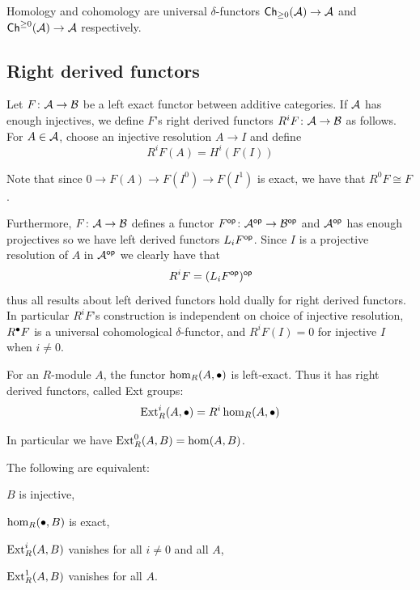 \bthrm

    Homology and cohomology are universal $\delta$-functors ${\sf Ch}_{\geq0}({{\cal A}})\to{{\cal A}}$ and ${\sf Ch}^{\geq0}({{\cal A}})\to{{\cal A}}$ respectively.

\ethrm

\subsection{Right derived functors}

\bdefn

    Let $F\colon{{\cal A}}\to{{\cal B}}$ be a left exact functor between additive categories.
    If ${{\cal A}}$ has enough injectives, we define $F$'s {\emphcolor right derived functors} $R^iF\colon{{\cal A}}\to{{\cal B}}$ as follows.
    For $A\in{{\cal A}}$, choose an injective resolution $A\to I$ and define
    $$ R^iF(A) = H^i(F(I)) $$

\edefn

Note that since $0\to F(A)\to F(I^0)\to F(I^1)$ is exact, we have that $R^0F\cong F$.

Furthermore, $F\colon{{\cal A}}\to{{\cal B}}$ defines a functor $F^{\sf op}\colon{{\cal A}}^{\sf op}\to{{\cal B}}^{\sf op}$ and ${{\cal A}}^{\sf op}$ has enough projectives so we have left derived functors $L_iF^{\sf op}$.
Since $I$ is a projective resolution of $A$ in ${{\cal A}}^{\sf op}$ we clearly have that
$$ R^iF = (L_iF^{\sf op})^{\sf op} $$
thus all results about left derived functors hold dually for right derived functors.
In particular $R^iF$'s construction is independent on choice of injective resolution, $R^\bullet F$ is a universal cohomological $\delta$-functor, and $R^iF(I)=0$ for injective $I$ when $i\neq0$.

\bdefn

    For an $R$-module $A$, the functor $\hom_R(A,\bullet)$ is left-exact.
    Thus it has right derived functors, called {\emphcolor Ext groups}:
    $$ {\rm Ext}^i_R(A,\bullet) = R^i\hom_R(A,\bullet) $$

\edefn

In particular we have ${\rm Ext}^0_R(A,B)=\hom(A,B)$.

\bprop

    The following are equivalent:
    \benum
        \item $B$ is injective,
        \item $\hom_R(\bullet,B)$ is exact,
        \item ${\rm Ext}^i_R(A,B)$ vanishes for all $i\neq0$ and all $A$,
        \item ${\rm Ext}^1_R(A,B)$ vanishes for all $A$.
    \eenum

\eprop

